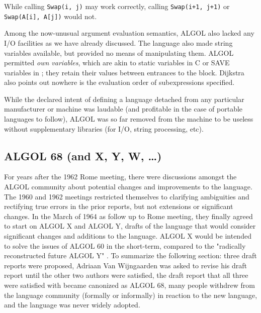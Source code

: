 

While calling \texttt{Swap(i, j)} may work correctly, calling
\texttt{Swap(i+1, j+1)} or \texttt{Swap(A[i], A[j])} would not.

Among the now-unusual argument evaluation semantics, ALGOL also lacked any I/O
facilities as we have already discussed.  The language also made string
variables available, but provided no means of manipulating them.  ALGOL
permitted \textit{own variables}, which are akin to static variables in C or
SAVE variables in \FTN{}; they retain their values between entrances to the
block.  Dijkstra also points out nowhere is the evaluation order of
subexpressions specified\cite{dijkstra_defense_of_algol_60_1961}.

While the declared intent of defining a language detached from any particular
manufacturer or machine was laudable (and profitable in the case of portable
languages to follow), ALGOL was so far removed from the machine to be useless without
supplementary libraries (for I/O, string processing, etc).

\subsection{ALGOL 68 (and X, Y, W, \dots)}

For years after the 1962 Rome meeting, there were discussions amongst the ALGOL
community about potential changes and improvements to the language.
The 1960 and 1962 meetings restricted themselves to clarifying ambiguities
and rectifying true errors in the prior reports, but not extensions or
significant changes.
In the March of 1964 as follow up to Rome meeting, they finally agreed to
start on ALGOL X and ALGOL Y, drafts of the language that would consider
significant changes and additions to the language.
ALGOL X would be intended to solve the issues of ALGOL 60 in the short-term,
compared to the "radically reconstructed future ALGOL Y"
\cite{cleaning_up_algol60_duncan_wijngaarden_1964}.
To summarize the following section: three draft reports were proposed,
Adriaan Van Wijngaarden was asked to revise his draft report until the other
two authors were satisfied,
the draft report that all three were satisfied with became canonized as ALGOL 68,
many people withdrew from the language community (formally or informally)
in reaction to the new language,
and the language was never widely adopted.



